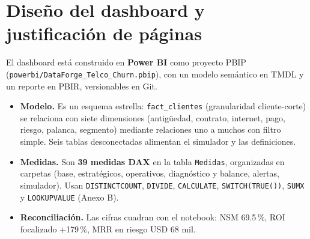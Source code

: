 \documentclass[10.5pt,a4paper]{article}
\begin{document}
\section{Diseño del dashboard y justificación de páginas}
El dashboard está construido en \textbf{Power BI} como proyecto PBIP (\texttt{powerbi/DataForge\_Telco\_Churn.pbip}), con un modelo semántico en TMDL y un reporte en PBIR, versionables en Git.
\begin{itemize}
  \item \textbf{Modelo.} Es un esquema estrella: \texttt{fact\_clientes} (granularidad cliente-corte) se relaciona con siete dimensiones (antigüedad, contrato, internet, pago, riesgo, palanca, segmento) mediante relaciones uno a muchos con filtro simple. Seis tablas desconectadas alimentan el simulador y las definiciones.
  \item \textbf{Medidas.} Son \textbf{39 medidas DAX} en la tabla \texttt{Medidas}, organizadas en carpetas (base, estratégicos, operativos, diagnóstico y balance, alertas, simulador). Usan \texttt{DISTINCTCOUNT}, \texttt{DIVIDE}, \texttt{CALCULATE}, \texttt{SWITCH(TRUE())}, \texttt{SUMX} y \texttt{LOOKUPVALUE} (Anexo B).
  \item \textbf{Reconciliación.} Las cifras cuadran con el notebook: NSM 69.5\,\%, ROI focalizado +179\,\%, MRR en riesgo USD 68 mil.
\end{itemize}
\end{document}
